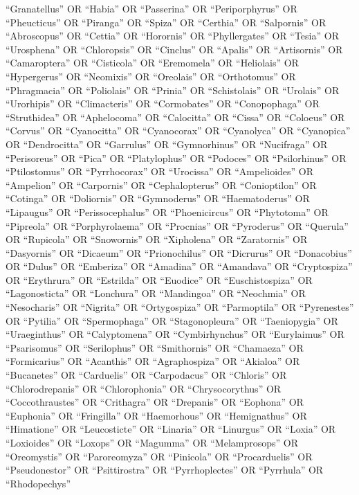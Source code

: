 \documentclass[
  number,
  review,
  onecolumn]{elsarticle}
\begin{document}
``Granatellus'' OR ``Habia'' OR ``Passerina'' OR ``Periporphyrus'' OR
``Pheucticus'' OR ``Piranga'' OR ``Spiza'' OR ``Certhia'' OR
``Salpornis'' OR ``Abroscopus'' OR ``Cettia'' OR ``Horornis'' OR
``Phyllergates'' OR ``Tesia'' OR ``Urosphena'' OR ``Chloropsis'' OR
``Cinclus'' OR ``Apalis'' OR ``Artisornis'' OR ``Camaroptera'' OR
``Cisticola'' OR ``Eremomela'' OR ``Heliolais'' OR ``Hypergerus'' OR
``Neomixis'' OR ``Oreolais'' OR ``Orthotomus'' OR ``Phragmacia'' OR
``Poliolais'' OR ``Prinia'' OR ``Schistolais'' OR ``Urolais'' OR
``Urorhipis'' OR ``Climacteris'' OR ``Cormobates'' OR ``Conopophaga'' OR
``Struthidea'' OR ``Aphelocoma'' OR ``Calocitta'' OR ``Cissa'' OR
``Coloeus'' OR ``Corvus'' OR ``Cyanocitta'' OR ``Cyanocorax'' OR
``Cyanolyca'' OR ``Cyanopica'' OR ``Dendrocitta'' OR ``Garrulus'' OR
``Gymnorhinus'' OR ``Nucifraga'' OR ``Perisoreus'' OR ``Pica'' OR
``Platylophus'' OR ``Podoces'' OR ``Psilorhinus'' OR ``Ptilostomus'' OR
``Pyrrhocorax'' OR ``Urocissa'' OR ``Ampelioides'' OR ``Ampelion'' OR
``Carpornis'' OR ``Cephalopterus'' OR ``Conioptilon'' OR ``Cotinga'' OR
``Doliornis'' OR ``Gymnoderus'' OR ``Haematoderus'' OR ``Lipaugus'' OR
``Perissocephalus'' OR ``Phoenicircus'' OR ``Phytotoma'' OR ``Pipreola''
OR ``Porphyrolaema'' OR ``Procnias'' OR ``Pyroderus'' OR ``Querula'' OR
``Rupicola'' OR ``Snowornis'' OR ``Xipholena'' OR ``Zaratornis'' OR
``Dasyornis'' OR ``Dicaeum'' OR ``Prionochilus'' OR ``Dicrurus'' OR
``Donacobius'' OR ``Dulus'' OR ``Emberiza'' OR ``Amadina'' OR
``Amandava'' OR ``Cryptospiza'' OR ``Erythrura'' OR ``Estrilda'' OR
``Euodice'' OR ``Euschistospiza'' OR ``Lagonosticta'' OR ``Lonchura'' OR
``Mandingoa'' OR ``Neochmia'' OR ``Nesocharis'' OR ``Nigrita'' OR
``Ortygospiza'' OR ``Parmoptila'' OR ``Pyrenestes'' OR ``Pytilia'' OR
``Spermophaga'' OR ``Stagonopleura'' OR ``Taeniopygia'' OR
``Uraeginthus'' OR ``Calyptomena'' OR ``Cymbirhynchus'' OR
``Eurylaimus'' OR ``Psarisomus'' OR ``Serilophus'' OR ``Smithornis'' OR
``Chamaeza'' OR ``Formicarius'' OR ``Acanthis'' OR ``Agraphospiza'' OR
``Akialoa'' OR ``Bucanetes'' OR ``Carduelis'' OR ``Carpodacus'' OR
``Chloris'' OR ``Chlorodrepanis'' OR ``Chlorophonia'' OR
``Chrysocorythus'' OR ``Coccothraustes'' OR ``Crithagra'' OR
``Drepanis'' OR ``Eophona'' OR ``Euphonia'' OR ``Fringilla'' OR
``Haemorhous'' OR ``Hemignathus'' OR ``Himatione'' OR ``Leucosticte'' OR
``Linaria'' OR ``Linurgus'' OR ``Loxia'' OR ``Loxioides'' OR ``Loxops''
OR ``Magumma'' OR ``Melamprosops'' OR ``Oreomystis'' OR ``Paroreomyza''
OR ``Pinicola'' OR ``Procarduelis'' OR ``Pseudonestor'' OR
``Psittirostra'' OR ``Pyrrhoplectes'' OR ``Pyrrhula'' OR ``Rhodopechys''
\end{document}
